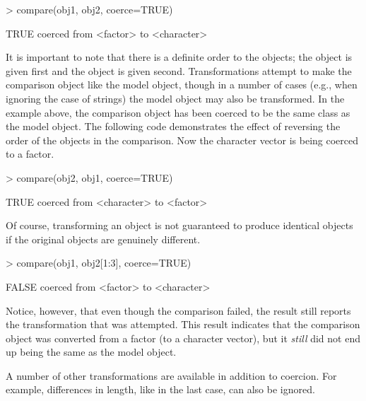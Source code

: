 \begin{Schunk}
\begin{Sinput}
> compare(obj1, obj2, coerce=TRUE)
\end{Sinput}
\begin{Soutput}
TRUE
  coerced from <factor> to <character>
\end{Soutput}
\end{Schunk}

It is important to note that there is a definite order to the
objects;  the  object is given first and the 
 object is given second.  Transformations
attempt to make the comparison object like the model object,
though in a number of cases (e.g., 
when ignoring the case of strings) the model object may also
be transformed.  In the example above, the comparison object
has been coerced to be the same class as
the model object.  The following code demonstrates the effect
of reversing the order of the objects in the comparison.  Now
the character vector is being coerced to a factor.

\begin{Schunk}
\begin{Sinput}
> compare(obj2, obj1, coerce=TRUE)
\end{Sinput}
\begin{Soutput}
TRUE
  coerced from <character> to <factor>
\end{Soutput}
\end{Schunk}
Of course, transforming an object is not guaranteed to produce 
identical objects if the original objects are genuinely different.

\begin{Schunk}
\begin{Sinput}
> compare(obj1, obj2[1:3], coerce=TRUE)
\end{Sinput}
\begin{Soutput}
FALSE
  coerced from <factor> to <character>
\end{Soutput}
\end{Schunk}
Notice, however, that even though the comparison failed,
 the result still reports the transformation
that was attempted.  This result indicates that the comparison
object was converted from a factor (to a character vector), but it
\emph{still} did not end up being the same as the model object.

A number of other transformations are available 
in addition to coercion.  For example, differences in length, like
in the last case, can also be ignored.

